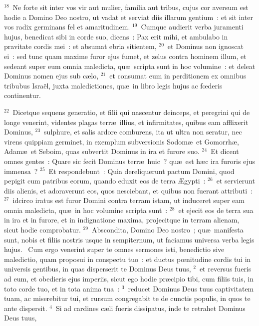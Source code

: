 ${}^{18}$~Ne forte sit inter vos vir aut mulier, familia aut tribus, cujus cor aversum est hodie a Domino Deo nostro, ut vadat et serviat diis illarum gentium~: et sit inter vos radix germinans fel et amaritudinem.
${}^{19}$~Cumque audierit verba juramenti hujus, benedicat sibi in corde suo, dicens~: Pax erit mihi, et ambulabo in pravitate cordis mei~: et absumat ebria sitientem,
${}^{20}$~et Dominus non ignoscat ei~: sed tunc quam maxime furor ejus fumet, et zelus contra hominem illum, et sedeant super eum omnia maledicta, qu\ae\ scripta sunt in hoc volumine~: et deleat Dominus nomen ejus sub c\ae lo,
${}^{21}$~et consumat eum in perditionem ex omnibus tribubus Isra\"el, juxta maledictiones, qu\ae\ in libro legis hujus ac fœderis continentur.


${}^{22}$~Dicetque sequens generatio, et filii qui nascentur deinceps, et peregrini qui de longe venerint, videntes plagas terr\ae\ illius, et infirmitates, quibus eam afflixerit Dominus,
${}^{23}$~sulphure, et salis ardore comburens, ita ut ultra non seratur, nec virens quippiam germinet, in exemplum subversionis Sodom\ae\ et Gomorrh\ae , Adam\ae\ et Seboim, quas subvertit Dominus in ira et furore suo.
${}^{24}$~Et dicent omnes gentes~: Quare sic fecit Dominus terr\ae\ huic~? qu\ae\ est h\ae c ira furoris ejus immensa~?
${}^{25}$~Et respondebunt~: Quia dereliquerunt pactum Domini, quod pepigit cum patribus eorum, quando eduxit eos de terra \AE gypti~:
${}^{26}$~et servierunt diis alienis, et adoraverunt eos, quos nesciebant, et quibus non fuerant attributi~:
${}^{27}$~idcirco iratus est furor Domini contra terram istam, ut induceret super eam omnia maledicta, qu\ae\ in hoc volumine scripta sunt~:
${}^{28}$~et ejecit eos de terra sua in ira et in furore, et in indignatione maxima, projecitque in terram alienam, sicut hodie comprobatur.
${}^{29}$~Abscondita, Domino Deo nostro~; qu\ae\ manifesta sunt, nobis et filiis nostris usque in sempiternum, ut faciamus universa verba legis hujus.
~Cum ergo venerint super te omnes sermones isti, benedictio sive maledictio, quam proposui in conspectu tuo~: et ductus pœnitudine cordis tui in universis gentibus, in quas disperserit te Dominus Deus tuus,
${}^{2}$~et reversus fueris ad eum, et obedieris ejus imperiis, sicut ego hodie pr\ae cipio tibi, cum filiis tuis, in toto corde tuo, et in tota anima tua~:
${}^{3}$~reducet Dominus Deus tuus captivitatem tuam, ac miserebitur tui, et rursum congregabit te de cunctis populis, in quos te ante dispersit.
${}^{4}$~Si ad cardines c\ae li fueris dissipatus, inde te retrahet Dominus Deus tuus,
